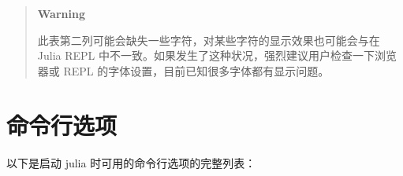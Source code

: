 \begin{quote}
\textbf{Warning}

此表第二列可能会缺失一些字符，对某些字符的显示效果也可能会与在 Julia REPL 中不一致。如果发生了这种状况，强烈建议用户检查一下浏览器或 REPL 的字体设置，目前已知很多字体都有显示问题。

\end{quote}


% 



\hypertarget{7890528511117722792}{}


\chapter{命令行选项}



以下是启动 julia 时可用的命令行选项的完整列表：




